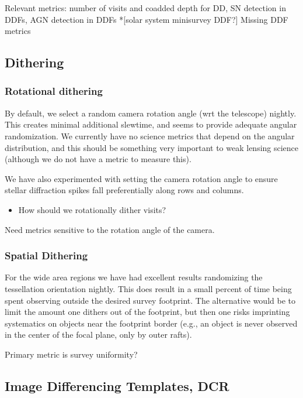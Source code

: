 Relevant metrics: number of visits and coadded depth for DD, SN detection in DDFs, AGN detection in DDFs
*[solar system minisurvey DDF?]
Missing DDF metrics

\subsection{Dithering}

\subsubsection{Rotational dithering}

By default, we select a random camera rotation angle (wrt the telescope) nightly. This creates minimal additional slewtime, and seems to provide adequate angular randomization.  We currently have no science metrics that depend on the angular distribution, and this should be something very important to weak lensing science (although we do not have a metric to measure this).

We have also experimented with setting the camera rotation angle to ensure stellar diffraction spikes fall preferentially along rows and columns. 

\begin{itemize}
    \item{How should we rotationally dither visits?}
\end{itemize}

Need metrics sensitive to the rotation angle of the camera. 

\subsubsection{Spatial Dithering}

For the wide area regions we have had excellent results randomizing the tessellation orientation nightly. This does result in a small percent of time being spent observing outside the desired survey footprint. The alternative would be to limit the amount one dithers out of the footprint, but then one risks imprinting systematics on objects near the footprint border (e.g., an object is never observed in the center of the focal plane, only by outer rafts).

Primary metric is survey uniformity?


\subsection{Image Differencing Templates, DCR}

